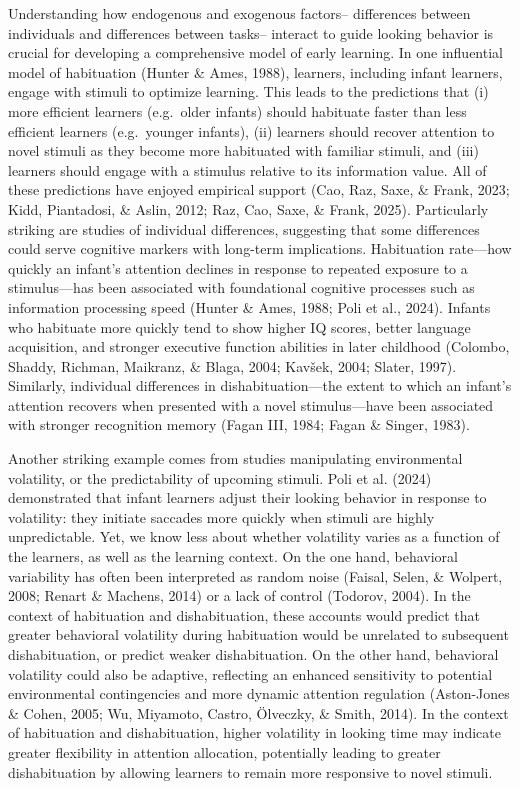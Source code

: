 \documentclass[10pt, letterpaper]{article}
\begin{document}
Understanding how endogenous and exogenous factors-- differences between
individuals and differences between tasks-- interact to guide looking
behavior is crucial for developing a comprehensive model of early
learning. In one influential model of habituation (Hunter \& Ames,
1988), learners, including infant learners, engage with stimuli to
optimize learning. This leads to the predictions that (i) more efficient
learners (e.g.~older infants) should habituate faster than less
efficient learners (e.g.~younger infants), (ii) learners should recover
attention to novel stimuli as they become more habituated with familiar
stimuli, and (iii) learners should engage with a stimulus relative to
its information value. All of these predictions have enjoyed empirical
support (Cao, Raz, Saxe, \& Frank, 2023; Kidd, Piantadosi, \& Aslin,
2012; Raz, Cao, Saxe, \& Frank, 2025). Particularly striking are studies
of individual differences, suggesting that some differences could serve
cognitive markers with long-term implications. Habituation rate---how
quickly an infant's attention declines in response to repeated exposure
to a stimulus---has been associated with foundational cognitive
processes such as information processing speed (Hunter \& Ames, 1988;
Poli et al., 2024). Infants who habituate more quickly tend to show
higher IQ scores, better language acquisition, and stronger executive
function abilities in later childhood (Colombo, Shaddy, Richman,
Maikranz, \& Blaga, 2004; Kavšek, 2004; Slater, 1997). Similarly,
individual differences in dishabituation---the extent to which an
infant's attention recovers when presented with a novel stimulus---have
been associated with stronger recognition memory (Fagan III, 1984; Fagan
\& Singer, 1983).

Another striking example comes from studies manipulating environmental
volatility, or the predictability of upcoming stimuli. Poli et al.
(2024) demonstrated that infant learners adjust their looking behavior
in response to volatility: they initiate saccades more quickly when
stimuli are highly unpredictable. Yet, we know less about whether
volatility varies as a function of the learners, as well as the learning
context. On the one hand, behavioral variability has often been
interpreted as random noise (Faisal, Selen, \& Wolpert, 2008; Renart \&
Machens, 2014) or a lack of control (Todorov, 2004). In the context of
habituation and dishabituation, these accounts would predict that
greater behavioral volatility during habituation would be unrelated to
subsequent dishabituation, or predict weaker dishabituation. On the
other hand, behavioral volatility could also be adaptive, reflecting an
enhanced sensitivity to potential environmental contingencies and more
dynamic attention regulation (Aston-Jones \& Cohen, 2005; Wu, Miyamoto,
Castro, Ölveczky, \& Smith, 2014). In the context of habituation and
dishabituation, higher volatility in looking time may indicate greater
flexibility in attention allocation, potentially leading to greater
dishabituation by allowing learners to remain more responsive to novel
stimuli.
\end{document}
